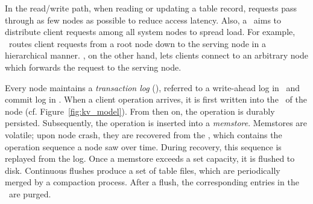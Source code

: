 In the read/write path, when reading or updating a table record,
requests pass through as few nodes as possible to reduce access
latency.  Also, a \KVS\ aims to distribute client requests among all
system nodes to spread load. For example, \HB\ routes client requests
from a root node down to the serving node in a hierarchical
manner. \CAS, on the other hand, lets clients connect to an arbitrary
node which forwards the request to the serving node.

Every node maintains a \textit{transaction log} (\TL), referred to a
write-ahead log in \HB\ and commit log in \CAS.  When a client
operation arrives, it is first written into the \TL\ of the node
(cf. Figure~\ref{fig:kv_model}). From then on, the operation is
durably persisted.  Subsequently, the operation is inserted into a
\textit{memstore}.  Memstores are volatile; upon node crash, they are
recovered from the \TL, which contains the operation sequence a node
saw over time.  During recovery, this sequence is replayed from the
log. Once a memstore exceeds a set capacity, it is flushed to disk.
Continuous flushes produce a set of table files, which are
periodically merged by a compaction process. After a flush, the
corresponding entries in the \TL\ are purged.

